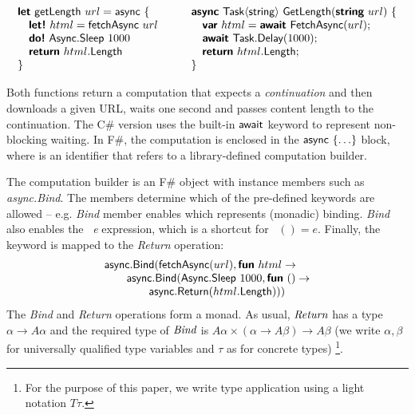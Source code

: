 \documentclass[runningheads,a4paper]{llncs}
\begin{document}
\begin{equation*}
\begin{array}{l}
\kvd{let}~\ident{getLength}~url=\ident{async}~\{\\
\quad \kvd{let!}~html = \ident{fetchAsync}~url\\
\quad \kvd{do!}~\ident{Async}.\ident{Sleep}~1000\\
\quad \kvd{return}~html.\ident{Length}\\
\}
\end{array}\qquad
\begin{array}{l}
\kvd{async}~\ident{Task}\langle\ident{string}\rangle~\ident{GetLength}(\kvd{string}~url)~\{\\
\quad \kvd{var}~html = \kvd{await}~\ident{FetchAsync}(url);\\
\quad \kvd{await}~\ident{Task}.\ident{Delay}(1000);\\
\quad \kvd{return}~html.\ident{Length};\\
\}
\end{array}
\end{equation*}

Both functions return a computation that expects a \emph{continuation} and then downloads a given 
URL, waits one second and passes content length to the continuation. The C\# version uses the built-in
$\textnormal{\sffamily await}$ keyword to represent non-blocking waiting. In F\#, the computation is enclosed
in the $\textnormal{\sffamily async}~\{ \ldots \}$ block, where  is an identifier that refers to
a library-defined computation builder. 

The computation builder  is an F\# object with instance members such as \emph{async.Bind}.
The members determine which of the pre-defined keywords are allowed -- e.g. \emph{Bind} member
enables  which represents (monadic) binding. \emph{Bind} also enables the ~\emph{e} 
expression, which is a shortcut for ~$()=e$. Finally, the  keyword is 
mapped to the \emph{Return} operation:
%
\begin{equation*}
\begin{array}{l}
\textnormal{\sffamily async}.\textnormal{\sffamily Bind}(\textnormal{\sffamily fetchAsync}(url), \textnormal{\bfseries\sffamily fun}~html\rightarrow\\
\qquad \textnormal{\sffamily async}.\textnormal{\sffamily Bind}(\textnormal{\sffamily Async}.\textnormal{\sffamily Sleep}~1000, \textnormal{\bfseries\sffamily fun}~()\rightarrow\\
\qquad\qquad \textnormal{\sffamily async}.\textnormal{\sffamily Return}(html.\textnormal{\sffamily Length})))
\end{array}
\end{equation*}
%
The \emph{Bind} and \emph{Return} operations form a monad. As usual, $\emph{Return}$ has a type $\alpha \rightarrow A\alpha$ 
and the required type of $\emph{Bind}$ is $A\alpha \times (\alpha \rightarrow A\beta) \rightarrow A\beta$ 
(we write $\alpha, \beta$ for universally qualified type variables and $\tau$ as for concrete types)
\footnote{For the purpose of this paper, we write type application using a light notation $T\tau$. }.
\end{document}
